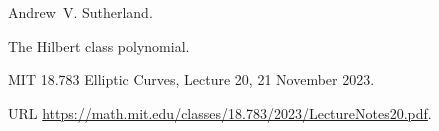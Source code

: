 Andrew~V. Sutherland.

\newblock The {Hilbert} class polynomial.

\newblock MIT 18.783 Elliptic Curves, Lecture 20, 21 November 2023.

\newblock URL
  \url{https://math.mit.edu/classes/18.783/2023/LectureNotes20.pdf}.
